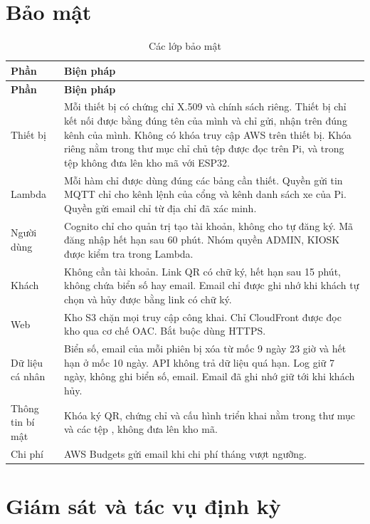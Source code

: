 \section{Bảo mật}

\begin{longtable}{@{}P{3.2cm}P{10.9cm}@{}}
\caption{Các lớp bảo mật}\label{tab:baomat}\\
\toprule
\textbf{Phần} & \textbf{Biện pháp} \\ \midrule
\endfirsthead
\toprule
\textbf{Phần} & \textbf{Biện pháp} \\ \midrule
\endhead
Thiết bị & Mỗi thiết bị có chứng chỉ X.509 và chính sách riêng. Thiết bị chỉ kết nối được bằng đúng tên của mình và chỉ gửi, nhận trên đúng kênh của mình. Không có khóa truy cập AWS trên thiết bị. Khóa riêng nằm trong thư mục chỉ chủ tệp được đọc trên Pi, và trong tệp  không đưa lên kho mã với ESP32. \\
Lambda & Mỗi hàm chỉ được dùng đúng các bảng cần thiết. Quyền gửi tin MQTT chỉ cho kênh lệnh của cổng và kênh danh sách xe của Pi. Quyền gửi email chỉ từ địa chỉ đã xác minh. \\
Người dùng & Cognito chỉ cho quản trị tạo tài khoản, không cho tự đăng ký. Mã đăng nhập hết hạn sau 60 phút. Nhóm quyền ADMIN, KIOSK được kiểm tra trong Lambda. \\
Khách & Không cần tài khoản. Link QR có chữ ký, hết hạn sau 15 phút, không chứa biển số hay email. Email chỉ được ghi nhớ khi khách tự chọn và hủy được bằng link có chữ ký. \\
Web & Kho S3 chặn mọi truy cập công khai. Chỉ CloudFront được đọc kho qua cơ chế OAC. Bắt buộc dùng HTTPS. \\
Dữ liệu cá nhân & Biển số, email của mỗi phiên bị xóa từ mốc 9 ngày 23 giờ và hết hạn ở mốc 10 ngày. API không trả dữ liệu quá hạn. Log giữ 7 ngày, không ghi biển số, email. Email đã ghi nhớ giữ tới khi khách hủy. \\
Thông tin bí mật & Khóa ký QR, chứng chỉ và cấu hình triển khai nằm trong thư mục  và các tệp , không đưa lên kho mã. \\
Chi phí & AWS Budgets gửi email khi chi phí tháng vượt ngưỡng. \\
\bottomrule
\end{longtable}

\section{Giám sát và tác vụ định kỳ}

